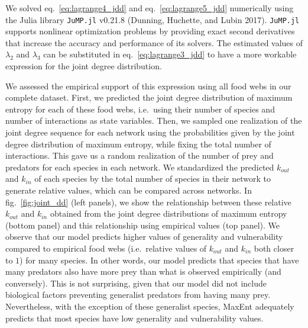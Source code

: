 \documentclass[11pt]{article}
\begin{document}
We solved eq.~\ref{eq:lagrange4_jdd} and eq.~\ref{eq:lagrange5_jdd}
numerically using the Julia library \texttt{JuMP.jl} v0.21.8 (Dunning,
Huchette, and Lubin 2017). \texttt{JuMP.jl} supports nonlinear
optimization problems by providing exact second derivatives that
increase the accuracy and performance of its solvers. The estimated
values of \(\lambda_2\) and \(\lambda_3\) can be substituted in
eq.~\ref{eq:lagrange3_jdd} to have a more workable expression for the
joint degree distribution.

We assessed the empirical support of this expression using all food webs
in our complete dataset. First, we predicted the joint degree
distribution of maximum entropy for each of these food webs, i.e.~using
their number of species and number of interactions as state variables.
Then, we sampled one realization of the joint degree sequence for each
network using the probabilities given by the joint degree distribution
of maximum entropy, while fixing the total number of interactions. This
gave us a random realization of the number of prey and predators for
each species in each network. We standardized the predicted \(k_{out}\)
and \(k_{in}\) of each species by the total number of species in their
network to generate relative values, which can be compared across
networks. In fig.~\ref{fig:joint_dd} (left panels), we show the
relationship between these relative \(k_{out}\) and \(k_{in}\) obtained
from the joint degree distributions of maximum entropy (bottom panel)
and this relationship using empirical values (top panel). We observe
that our model predicts higher values of generality and vulnerability
compared to empirical food webs (i.e.~relative values of \(k_{out}\) and
\(k_{in}\) both closer to \(1\)) for many species. In other words, our
model predicts that species that have many predators also have more prey
than what is observed empirically (and conversely). This is not
surprising, given that our model did not include biological factors
preventing generalist predators from having many prey. Nevertheless,
with the exception of these generalist species, MaxEnt adequately
predicts that most species have low generality and vulnerability values.
\end{document}
